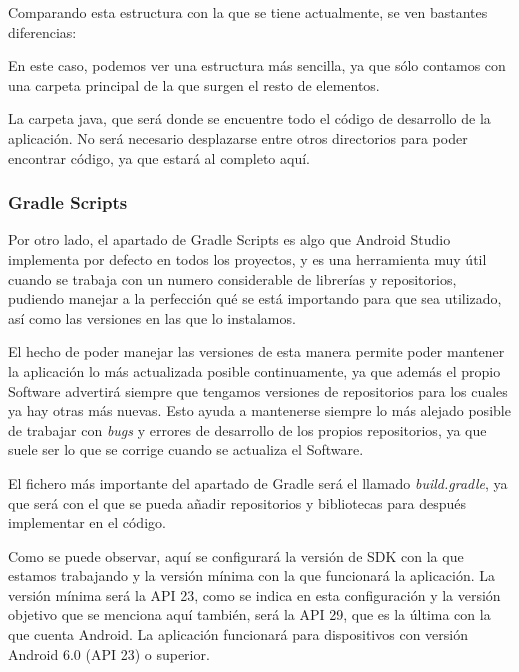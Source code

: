 Comparando esta estructura con la que se tiene actualmente, se ven bastantes diferencias:


En este caso, podemos ver una estructura más sencilla, ya que sólo contamos con una carpeta principal de la que surgen el resto de elementos. 

La carpeta java, que será donde se encuentre todo el código de desarrollo de la aplicación. No será necesario desplazarse entre otros directorios para poder encontrar código, ya que estará al completo aquí.

\subsubsection{Gradle Scripts}

Por otro lado, el apartado de Gradle Scripts \cite{gradle1} es algo que Android Studio implementa por defecto en todos los proyectos, y es una herramienta muy útil cuando se trabaja con un numero considerable de librerías y repositorios, pudiendo manejar a la perfección qué se está importando para que sea utilizado, así como las versiones en las que lo instalamos.

El hecho de poder manejar las versiones de esta manera permite poder mantener la aplicación lo más actualizada posible continuamente, ya que además el propio Software advertirá siempre que tengamos versiones de repositorios para los cuales ya hay otras más nuevas. Esto ayuda a mantenerse siempre lo más alejado posible de trabajar con \textit{bugs} y errores de desarrollo de los propios repositorios, ya que suele ser lo que se corrige cuando se actualiza el Software.

El fichero más importante del apartado de Gradle será el llamado \textit{build.gradle}, ya que será con el que se pueda añadir repositorios y bibliotecas para después implementar en el código.


Como se puede observar, aquí se configurará la versión de SDK con la que estamos trabajando y la versión mínima con la que funcionará la aplicación. La versión mínima será la API 23, como se indica en esta configuración y la versión objetivo que se menciona aquí también, será la API 29, que es la última con la que cuenta Android. La aplicación funcionará para dispositivos con versión Android 6.0 (API 23) o superior.

